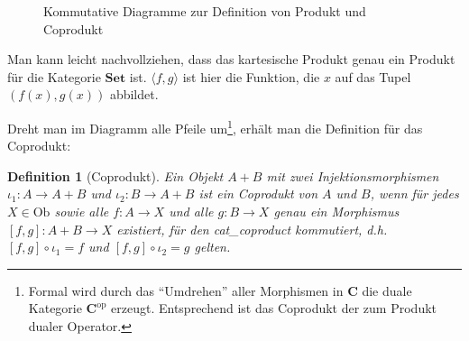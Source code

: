 \documentclass[11pt, a4paper, bibgerm]{scrbook}
\newcommand\abb{}
\newcommand\ato{\rightarrow} %
\newtheorem{defini}{Definition}
\newcommand{\defi}[2]{%
  \begin{defini}[#1]
    \label{def:#1}
    #2
  \end{defini}
}
\begin{document}
\begin{figure}
  \centering
  \caption{Kommutative Diagramme zur Definition von Produkt und Coprodukt}
\end{figure}

Man kann leicht nachvollziehen, dass das kartesische Produkt genau ein
Produkt für die Kategorie $\mathbf{Set}$ ist. $\langle f,g \rangle$ ist
hier die Funktion, die $x$ auf das Tupel $(f(x), g(x))$ abbildet.

Dreht man im Diagramm alle Pfeile um\footnote{Formal wird durch das
  ``Umdrehen'' aller Morphismen in $\mathbf{C}$ die duale Kategorie
  $\mathbf{C}^{\mathrm{op}}$ erzeugt. Entsprechend ist das Coprodukt der
  zum Produkt dualer Operator.}, erhält man die Definition für das
Coprodukt:

\defi{Coprodukt}{ Ein Objekt $A + B$ mit zwei Injektionsmorphismen
  $\iota_1 : A \ato A + B$ und $\iota_2 : B \ato A + B$ ist ein
  Coprodukt von $A$ und $B$, wenn für jedes $X \in \mathrm{Ob}$ sowie
  alle $f : A \ato X$ und alle $g : B \ato X$ genau ein Morphismus
  $[f,g] : A + B \ato X$ existiert, für den \abb{cat_coproduct}
  kommutiert, d.h.  $[f,g] \circ \iota_1 = f$ und $[f,g] \circ \iota_2 =
  g$ gelten.  }
\end{document}
